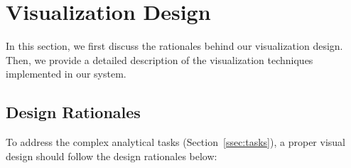 \section{Visualization Design}

In this section, we first discuss the rationales behind our visualization design. 
Then, we provide a detailed description of the visualization techniques implemented in our system.


\subsection{Design Rationales}
To address the complex analytical tasks (Section~\ref{ssec:tasks}), a proper visual design should follow the design rationales below:

